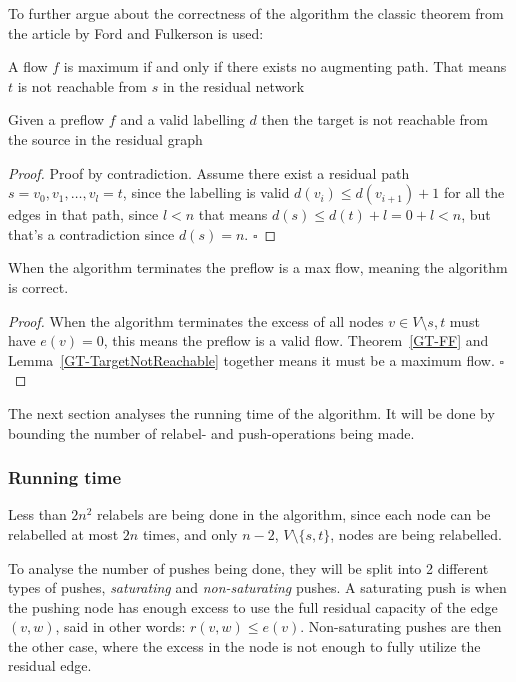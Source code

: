 To further argue about the correctness of the algorithm the classic theorem from the article by Ford and Fulkerson \cite{FordFulkerson} is used:
\begin{theorem} \label{GT-FF}
A flow $f$ is maximum if and only if there exists no augmenting path. That means $t$ is not reachable from $s$ in the residual network
\end{theorem}
\begin{lemma} \label{GT-TargetNotReachable}
Given a preflow $f$ and a valid labelling $d$ then the target is not reachable from the source in the residual graph
\end{lemma}
\begin{proof}
Proof by contradiction. Assume there exist a residual path $s = v_0, v_1,\dots,v_l = t$,
since the labelling is valid $d(v_i) \leq d(v_{i+1})+1$ for all the edges in that path,
since $l < n$ that means $d(s) \leq d(t) + l = 0 + l < n$, but that's a contradiction
since $d(s) = n$.
$\square$
\end{proof}
\begin{theorem}
When the algorithm terminates the preflow is a max flow, meaning the algorithm is correct.
\end{theorem}
\begin{proof}
	When the algorithm terminates the excess of all nodes $v \in V \setminus{s,t}$
	must have $e(v) = 0$, this means the preflow is a valid flow. 
	Theorem~\ref{GT-FF} and Lemma~\ref{GT-TargetNotReachable} together means it must be a 
	maximum flow. 
$\square$
\end{proof}
The next section analyses the running time of the algorithm. It will be done by bounding the number 
of relabel- and push-operations being made.

\subsubsection{Running time} \label{GT88-RunningTime}
Less than $2n^2$ relabels are being done in the algorithm, since each node can be relabelled at most
$2n$ times, and only $n-2$, $V \setminus \{s,t\}$, nodes are being relabelled.

To analyse the number of pushes being done, they will be split into 2 different types of pushes, \emph{saturating} and
\emph{non-saturating} pushes. A saturating push is when the pushing node has enough excess to use the full residual capacity
of the edge $(v,w)$, said in other words: $r(v,w) \leq e(v)$. Non-saturating pushes are then the other case, where the excess in the node is not
enough to fully utilize the residual edge.

